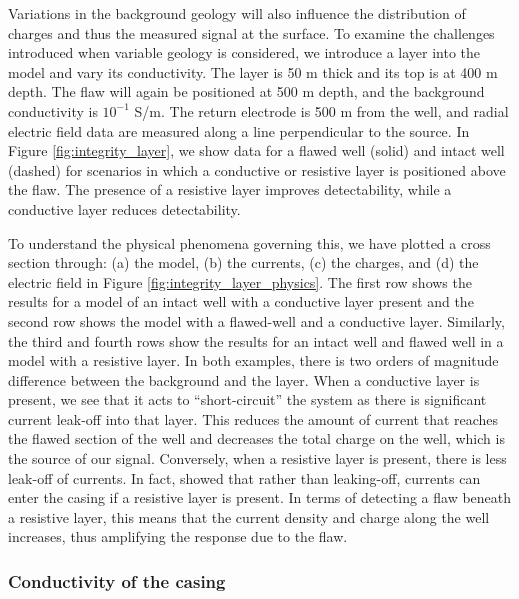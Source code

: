 \documentclass[extra,mreferee]{gji}
\begin{document}


Variations in the background geology will also influence the distribution of charges and thus the measured signal at the surface. To examine the challenges introduced when variable geology is considered, we introduce a layer into the model and vary its conductivity. The layer is 50 m thick and its top is at 400 m depth. The flaw will again be positioned at 500 m depth, and the background conductivity is $10^{-1}$ S/m. The return electrode is 500 m from the well, and radial electric field data are measured along a line perpendicular to the source. In Figure \ref{fig:integrity_layer}, we show data for a flawed well (solid) and intact well (dashed) for scenarios in which a conductive or resistive layer is positioned above the flaw. The presence of a resistive layer improves detectability, while a conductive layer reduces detectability.



To understand the physical phenomena governing this, we have plotted a cross section through: (a) the model, (b) the currents, (c) the charges, and (d) the electric field in Figure \ref{fig:integrity_layer_physics}. The first row shows the results for a model of an intact well with a conductive layer present and the second row shows the model with a flawed-well and a conductive layer. Similarly, the third and fourth rows show the results for an intact well and flawed well in a model with a resistive layer. In both examples, there is two orders of magnitude difference between the background and the layer. When a conductive layer is present, we see that it acts to ``short-circuit'' the system as there is significant current leak-off into that layer. This reduces the amount of current that reaches the flawed section of the well and decreases the total charge on the well, which is the source of our signal. Conversely, when a resistive layer is present, there is less leak-off of currents. In fact, \cite{Yang2016} showed that rather than leaking-off, currents can enter the casing if a resistive layer is present. In terms of detecting a flaw beneath a resistive layer, this means that the current density and charge along the well increases, thus amplifying the response due to the flaw.




\subsubsection{Conductivity of the casing}
\end{document}
